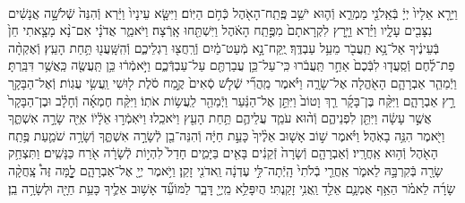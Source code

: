\documentclass[twoside, openany, parskip=half, 11pt]{book}
\begin{document}
\begin{footnotesize}
\begin{multicols}{2}
\\
וַיֵּרָ֤א אֵלָיו֙ יְיָ֔ בְּֿאֵֽלֹנֵ֖י מַמְרֵ֑א וְֿה֛וּא יֹשֵׁ֥ב פֶּֽתַֽח־הָאֹ֖הֶל כְּֿחֹ֥ם הַיּֽוֹם׃ וַיִּשָּׂ֤א עֵינָיו֙ וַיַּ֔רְא וְֿהִנֵּה֙ שְֿׁלֹשָׁ֣ה אֲנָשִׁ֔ים נִצָּבִ֖ים עָלָ֑יו וַיַּ֗רְא וַיָּ֤רָץ לִקְרָאתָם֙ מִפֶּ֣תַֽח הָאֹ֔הֶל וַיִּשְׁתַּ֖חוּ אָֽרְֿצָה׃ וַיֹּאמַ֑ר אֲדֹנָ֗י אִם־נָ֨א מָצָ֤אתִי חֵן֙ בְּֿעֵינֶ֔יךָ אַל־נָ֥א תַֽעֲבֹ֖ר מֵעַ֥ל עַבְדֶּֽךָ׃
יֻֽקַּח־נָ֣א מְֿעַט־מַ֔יִם וְֿרַֽחֲצ֖וּ רַגְלֵיכֶ֑ם וְֿהִֽשָּֽׁעֲנ֖וּ תַּ֥חַת הָעֵֽץ׃ וְֿאֶקְחָ֨ה פַת־לֶ֜חֶם וְֿסַֽעֲד֤וּ לִבְּֿכֶם֙ אַחַ֣ר תַּֽעֲבֹ֔רוּ כִּֽי־עַל־כֵּ֥ן עֲבַרְתֶּ֖ם עַל־עַבְדְּֿכֶ֑ם וַיֹּ֣אמְֿר֔וּ כֵּ֥ן תַּֽעֲשֶׂ֖ה כַּֽאֲשֶׁ֥ר דִּבַּֽרְתָּ׃
וַיְֿמַהֵ֧ר אַבְרָהָ֛ם הָאֹ֖הֱלָה אֶל־שָׂרָ֑ה וַיֹּ֗אמֶר מַֽהֲרִ֞י שְֿׁלֹ֤שׁ סְֿאִים֙ קֶ֣מַח סֹ֔לֶת ל֖וּשִׁי וַֽעֲשִׂ֥י עֻגֽוֹת׃ וְֿאֶל־הַבָּקָ֖ר רָ֣ץ אַבְרָהָ֑ם וַיִּקַּ֨ח בֶּן־בָּקָ֜ר רַ֤ךְ וָטוֹב֙ וַיִּתֵּ֣ן אֶל־הַנַּ֔עַר וַיְֿמַהֵ֖ר לַֽעֲשׂ֥וֹת אֹתֽוֹ׃ וַיִּקַּ֨ח חֶמְאָ֜ה וְֿחָלָ֗ב וּבֶן־הַבָּקָר֙ אֲשֶׁ֣ר עָשָׂ֔ה וַיִּתֵּ֖ן לִפְנֵיהֶ֑ם וְֿה֨וּא עֹמֵ֧ד עֲלֵיהֶ֛ם תַּ֥חַת הָעֵ֖ץ וַיֹּאכֵֽלוּ׃  וַיֹּאֽמְֿר֣וּ אֵֹלָ֔יֹוֹ אַיֵּ֖ה שָׂרָ֣ה אִשְׁתֶּ֑ךָ וַיֹּ֖אמֶר הִנֵּ֥ה בָאֹֽהֶל׃ וַיֹּ֗אמֶר שׁ֣וֹב אָשׁ֤וּב אֵלֶ֨יךָ֙ כָּעֵ֣ת חַיָּ֔ה וְֿהִנֵּה־בֵ֖ן לְֿשָׂרָ֣ה אִשְׁתֶּ֑ךָ וְֿשָׂרָ֥ה שֹׁמַ֛עַת פֶּ֥תַֽח הָאֹ֖הֶל וְֿה֥וּא אַֽחֲרָֽיו׃ וְֿאַבְרָהָ֤ם וְֿשָׂרָה֙ זְֿקֵנִ֔ים בָּאִ֖ים בַּיָּמִ֑ים חָדַל֙ לִהְי֣וֹת לְֿשָׂרָ֔ה אֹ֖רַח כַּנָּשִֽׁים׃ וַתִּצְחַ֥ק שָׂרָ֖ה בְּֿקִרְבָּ֣הּ לֵאמֹ֑ר אַֽחֲרֵ֤י בְֿלֹתִי֙ הָֽיְֿתָה־לִּ֣י עֶדְנָ֔ה וַֽאדֹנִ֖י זָקֵֽן׃ וַיֹּ֥אמֶר יְיָ֖ אֶל־אַבְרָהָ֑ם לׇׇׇָ֣מָּה זֶּה֩ צָֽחֲקָ֨ה שָׂרָ֜ה לֵאמֹ֗ר הַאַ֥ף אֻמְנָ֛ם אֵלֵ֖ד וַֽאֲנִ֥י זָקַֽנְתִּי׃ הֲיִפָּלֵ֥א מֵֽיְיָ֖ דָּבָ֑ר לַמּוֹעֵ֞ד אָשׁ֥וּב אֵלֶ֛יךָ כָּעֵ֥ת חַיָּ֖ה וּלְשָׂרָ֥ה בֵֽן׃


\end{multicols}
\end{footnotesize}
\end{document}
